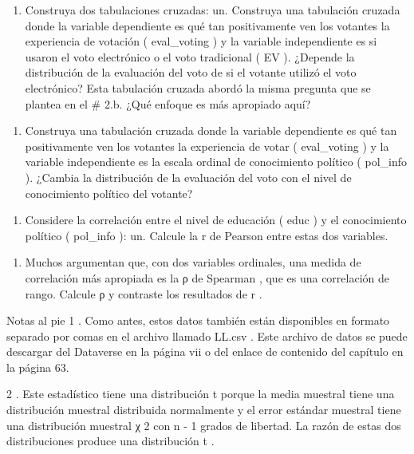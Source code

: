 \documentclass[
]{book}
\providecommand{\tightlist}{%
  \setlength{\itemsep}{0pt}\setlength{\parskip}{0pt}}
\begin{document}
\begin{enumerate}
\def\labelenumi{\arabic{enumi}.}
\setcounter{enumi}{2}
\tightlist
\item
  Construya dos tabulaciones cruzadas:
  un.
  Construya una tabulación cruzada donde la variable dependiente es qué tan positivamente ven los votantes la experiencia de votación ( eval\_voting ) y la variable independiente es si usaron el voto electrónico o el voto tradicional ( EV ). ¿Depende la distribución de la evaluación del voto de si el votante utilizó el voto electrónico? Esta tabulación cruzada abordó la misma pregunta que se plantea en el \# 2.b. ¿Qué enfoque es más apropiado aquí?
\end{enumerate}

\begin{enumerate}
\def\labelenumi{\Alph{enumi}.}
\setcounter{enumi}{1}
\tightlist
\item
  Construya una tabulación cruzada donde la variable dependiente es qué tan positivamente ven los votantes la experiencia de votar ( eval\_voting ) y la variable independiente es la escala ordinal de conocimiento político ( pol\_info ). ¿Cambia la distribución de la evaluación del voto con el nivel de conocimiento político del votante?
\end{enumerate}

\begin{enumerate}
\def\labelenumi{\arabic{enumi}.}
\setcounter{enumi}{3}
\tightlist
\item
  Considere la correlación entre el nivel de educación ( educ ) y el conocimiento político ( pol\_info ):
  un.
  Calcule la r de Pearson entre estas dos variables.
\end{enumerate}

\begin{enumerate}
\def\labelenumi{\Alph{enumi}.}
\setcounter{enumi}{1}
\tightlist
\item
  Muchos argumentan que, con dos variables ordinales, una medida de correlación más apropiada es la ρ de Spearman , que es una correlación de rango. Calcule ρ y contraste los resultados de r .
\end{enumerate}

Notas al pie
1 .
Como antes, estos datos también están disponibles en formato separado por comas en el archivo llamado LL.csv . Este archivo de datos se puede descargar del Dataverse en la página vii o del enlace de contenido del capítulo en la página 63.

2 .
Este estadístico tiene una distribución t porque la media muestral tiene una distribución muestral distribuida normalmente y el error estándar muestral tiene una distribución muestral χ 2 con n - 1 grados de libertad. La razón de estas dos distribuciones produce una distribución t .
\end{document}
